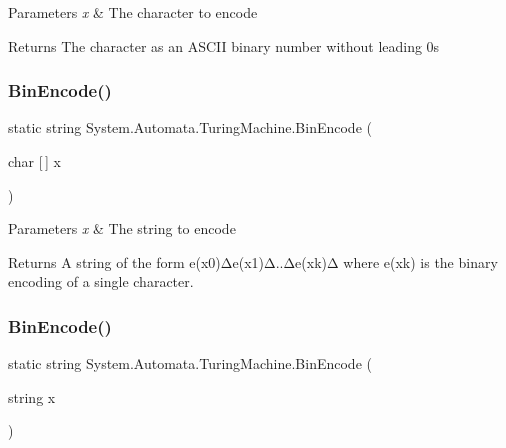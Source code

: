 \begin{DoxyParams}{Parameters}
{\em x} & The character to encode\\
\hline
\end{DoxyParams}
\begin{DoxyReturn}{Returns}
The character as an A\+S\+C\+II binary number without leading 0s
\end{DoxyReturn}
\mbox{\label{class_system_1_1_automata_1_1_turing_machine_a9f6c774477e3ed6600244bb0ffbe1579}} 
\subsubsection{\texorpdfstring{Bin\+Encode()}{BinEncode()}\hspace{0.1cm}{\footnotesize\ttfamily [3/6]}}
{\footnotesize\ttfamily static string System.\+Automata.\+Turing\+Machine.\+Bin\+Encode (\begin{DoxyParamCaption}\item[{char \mbox{[}$\,$\mbox{]}}]{x }\end{DoxyParamCaption})\hspace{0.3cm}{\ttfamily [static]}}


\begin{DoxyParams}{Parameters}
{\em x} & The string to encode\\
\hline
\end{DoxyParams}
\begin{DoxyReturn}{Returns}
A string of the form e(x0)Δe(x1)Δ..Δe(xk)Δ where e(xk) is the binary encoding of a single character.
\end{DoxyReturn}
\mbox{\label{class_system_1_1_automata_1_1_turing_machine_a559b0d5709eab0bd072c9ae1da449cf4}} 
\subsubsection{\texorpdfstring{Bin\+Encode()}{BinEncode()}\hspace{0.1cm}{\footnotesize\ttfamily [4/6]}}
{\footnotesize\ttfamily static string System.\+Automata.\+Turing\+Machine.\+Bin\+Encode (\begin{DoxyParamCaption}\item[{string}]{x }\end{DoxyParamCaption})\hspace{0.3cm}{\ttfamily [static]}}


